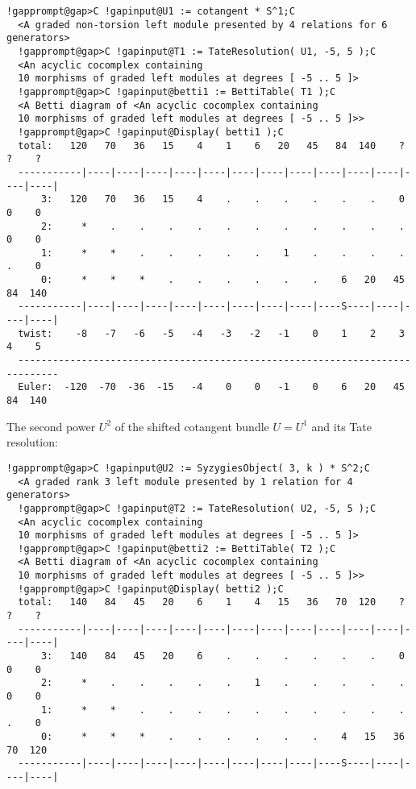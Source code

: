 \documentclass[a4paper,11pt]{report}
\begin{document}
{{{\begin{Verbatim}[commandchars=!@C,fontsize=\small,frame=single,label=Example]
  !gapprompt@gap>C !gapinput@U1 := cotangent * S^1;C
  <A graded non-torsion left module presented by 4 relations for 6 generators>
  !gapprompt@gap>C !gapinput@T1 := TateResolution( U1, -5, 5 );C
  <An acyclic cocomplex containing
  10 morphisms of graded left modules at degrees [ -5 .. 5 ]>
  !gapprompt@gap>C !gapinput@betti1 := BettiTable( T1 );C
  <A Betti diagram of <An acyclic cocomplex containing 
  10 morphisms of graded left modules at degrees [ -5 .. 5 ]>>
  !gapprompt@gap>C !gapinput@Display( betti1 );C
  total:   120   70   36   15    4    1    6   20   45   84  140    ?    ?    ?
  -----------|----|----|----|----|----|----|----|----|----|----|----|----|----|
      3:   120   70   36   15    4    .    .    .    .    .    .    0    0    0
      2:     *    .    .    .    .    .    .    .    .    .    .    .    0    0
      1:     *    *    .    .    .    .    .    1    .    .    .    .    .    0
      0:     *    *    *    .    .    .    .    .    .    6   20   45   84  140
  -----------|----|----|----|----|----|----|----|----|----S----|----|----|----|
  twist:    -8   -7   -6   -5   -4   -3   -2   -1    0    1    2    3    4    5
  -----------------------------------------------------------------------------
  Euler:  -120  -70  -36  -15   -4    0    0   -1    0    6   20   45   84  140
\end{Verbatim}
 The second power $U^2$ of the shifted cotangent bundle $U=U^1$ and its Tate resolution: 
\begin{Verbatim}[commandchars=!@C,fontsize=\small,frame=single,label=Example]
  !gapprompt@gap>C !gapinput@U2 := SyzygiesObject( 3, k ) * S^2;C
  <A graded rank 3 left module presented by 1 relation for 4 generators>
  !gapprompt@gap>C !gapinput@T2 := TateResolution( U2, -5, 5 );C
  <An acyclic cocomplex containing
  10 morphisms of graded left modules at degrees [ -5 .. 5 ]>
  !gapprompt@gap>C !gapinput@betti2 := BettiTable( T2 );C
  <A Betti diagram of <An acyclic cocomplex containing 
  10 morphisms of graded left modules at degrees [ -5 .. 5 ]>>
  !gapprompt@gap>C !gapinput@Display( betti2 );C
  total:   140   84   45   20    6    1    4   15   36   70  120    ?    ?    ?
  -----------|----|----|----|----|----|----|----|----|----|----|----|----|----|
      3:   140   84   45   20    6    .    .    .    .    .    .    0    0    0
      2:     *    .    .    .    .    .    1    .    .    .    .    .    0    0
      1:     *    *    .    .    .    .    .    .    .    .    .    .    .    0
      0:     *    *    *    .    .    .    .    .    .    4   15   36   70  120
  -----------|----|----|----|----|----|----|----|----|----S----|----|----|----|

\end{Verbatim}}}}
\end{document}
